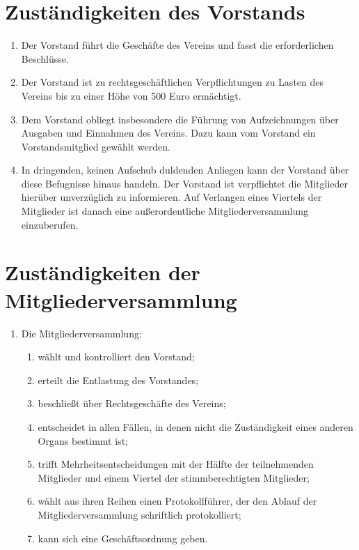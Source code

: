 \documentclass[ngerman]{article}
\begin{document}
\section{Zuständigkeiten des Vorstands}
\begin{enumerate}
  \item Der Vorstand führt die Geschäfte des Vereins und fasst die erforderlichen Beschlüsse.
  \item Der Vorstand ist zu rechtsgeschäftlichen Verpflichtungen zu Lasten des Vereins bis zu einer Höhe von 500 Euro ermächtigt.
  \item Dem Vorstand obliegt insbesondere die Führung von Aufzeichnungen über Ausgaben und Einnahmen des Vereins.   Dazu kann vom Vorstand ein Vorstandsmitglied gewählt werden.
  \item In dringenden, keinen Aufschub duldenden Anliegen kann der Vorstand über diese Befugnisse hinaus handeln. Der Vorstand ist verpflichtet die Mitglieder hierüber unverzüglich zu informieren. Auf Verlangen eines Viertels der Mitglieder ist danach eine außerordentliche Mitgliederversammlung einzuberufen.
\end{enumerate}


\section{Zuständigkeiten der Mitgliederversammlung}
\begin{enumerate}
  \item Die Mitgliederversammlung:
  \begin{enumerate}
    \item wählt und kontrolliert den Vorstand;
    \item erteilt die Entlastung des Vorstandes;
    \item beschließt über Rechtsgeschäfte des Vereins;
    \item entscheidet in allen Fällen, in denen nicht die Zuständigkeit eines anderen Organs bestimmt ist;
    \item trifft Mehrheitsentscheidungen mit der Hälfte der teilnehmenden Mitglieder und einem Viertel der stimmberechtigten Mitglieder;
    \item wählt aus ihren Reihen einen Protokollführer, der den Ablauf der Mitgliederversammlung schriftlich protokolliert;
    \item kann sich eine Geschäftsordnung geben.
  \end{enumerate}
\end{enumerate}
\end{document}
